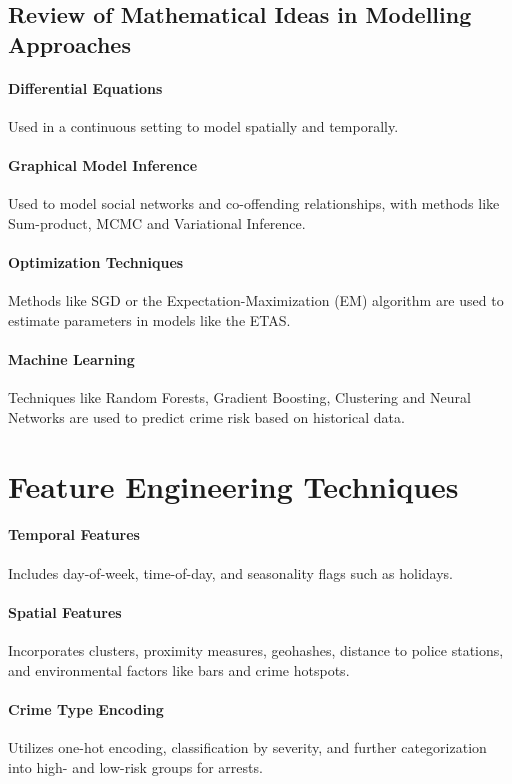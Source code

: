 \documentclass[11pt]{article}
\begin{document}
\subsection{Review of Mathematical Ideas in Modelling Approaches}
\paragraph{Differential Equations} Used in a continuous setting to model spatially and temporally.
\paragraph{Graphical Model Inference} Used to model social networks and co-offending relationships, with methods like Sum-product, MCMC and Variational Inference.
\paragraph{Optimization Techniques} Methods like SGD or the Expectation-Maximization (EM) algorithm are used to estimate parameters in models like the ETAS.
\paragraph{Machine Learning} Techniques like Random Forests, Gradient Boosting, Clustering and Neural Networks are used to predict crime risk based on historical data.

\section{Feature Engineering Techniques}
\paragraph{Temporal Features} Includes day-of-week, time-of-day, and seasonality flags such as holidays.
\paragraph{Spatial Features} Incorporates clusters, proximity measures, geohashes, distance to police stations, and environmental factors like bars and crime hotspots.
\paragraph{Crime Type Encoding} Utilizes one-hot encoding, classification by severity, and further categorization into high- and low-risk groups for arrests.
\end{document}
